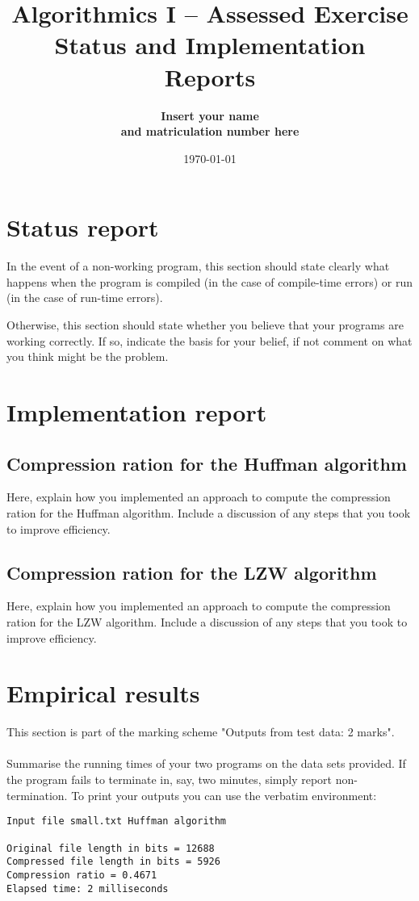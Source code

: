 \documentclass[11pt,a4paper]{article}
\title{Algorithmics I -- Assessed Exercise\\ \vspace{4mm} 
Status and Implementation Reports}
\author{\bf Insert your name\\ \bf and matriculation number here}
\date{\today}
\begin{document}
\maketitle

\section*{Status report}

In the event of a non-working program, this section should state clearly what happens when the program is compiled (in the case of compile-time errors) or run (in the case of run-time errors).  

Otherwise, this section should state whether you believe that your programs are working correctly. If so, indicate the basis for your belief, if not comment on what you think might be the problem.

\section*{Implementation report}

\subsection*{Compression ration for the Huffman algorithm}

Here, explain how you implemented an approach to compute the compression ration for the Huffman algorithm. Include a discussion of any steps that you took to improve efficiency.

\subsection*{Compression ration for the LZW algorithm}

Here, explain how you implemented an approach to compute the compression ration for the LZW algorithm. Include a discussion of any steps that you took to improve efficiency.


\section*{Empirical results}

This section is part of the marking scheme "Outputs from test data: 2 marks".
\\ \\
Summarise the running times of your two programs on the data sets provided. If the program fails to terminate in, say, two minutes, simply report non-termination. To print your outputs you can use the verbatim environment:

\begin{verbatim}
Input file small.txt Huffman algorithm

Original file length in bits = 12688
Compressed file length in bits = 5926
Compression ratio = 0.4671
Elapsed time: 2 milliseconds
\end{verbatim}
\end{document}
